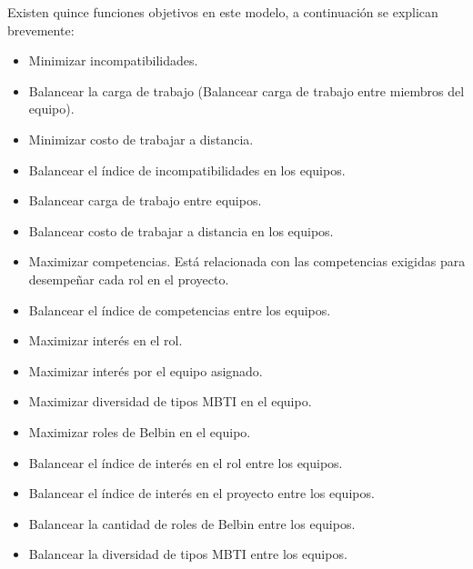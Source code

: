 Existen quince funciones objetivos en este modelo, a continuación se explican brevemente:
\begin{itemize}
	\item Minimizar incompatibilidades.
	\item Balancear la carga de trabajo (Balancear carga de trabajo entre miembros del equipo).
	\item Minimizar costo de trabajar a distancia.
	\item Balancear el índice de incompatibilidades en los equipos.
	\item Balancear carga de trabajo entre equipos.
	\item Balancear costo de trabajar a distancia en los equipos.
	\item Maximizar competencias. Está relacionada con las competencias exigidas para desempeñar cada rol en el proyecto.
	\item Balancear el índice de competencias entre los equipos.
	\item Maximizar interés en el rol.
	\item Maximizar interés por el equipo asignado.
	\item Maximizar diversidad de tipos MBTI en el equipo.
	\item Maximizar roles de Belbin en el equipo.
	\item Balancear el índice de interés en el rol entre los equipos.
	\item Balancear el índice de interés en el proyecto entre los equipos.
	\item Balancear la cantidad de roles de Belbin entre los equipos.
	\item Balancear la diversidad de tipos MBTI entre los equipos.
\end{itemize}

